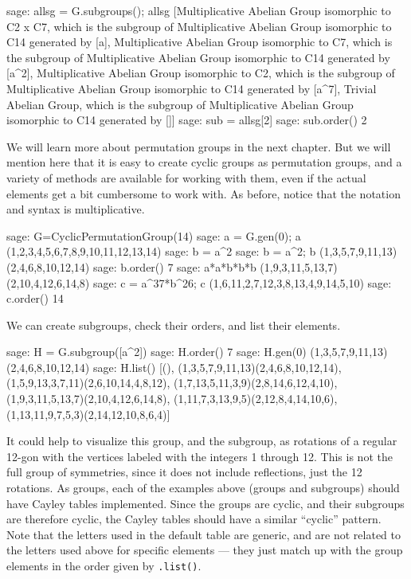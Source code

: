 %
\begin{sageexample}
sage: allsg = G.subgroups(); allsg
[Multiplicative Abelian Group isomorphic to C2 x C7,
 which is the subgroup of Multiplicative Abelian Group
 isomorphic to C14 generated by [a],
 Multiplicative Abelian Group isomorphic to C7,
 which is the subgroup of Multiplicative Abelian Group
 isomorphic to C14 generated by [a^2],
 Multiplicative Abelian Group isomorphic to C2,
 which is the subgroup of Multiplicative Abelian Group
 isomorphic to C14 generated by [a^7],
 Trivial Abelian Group,
 which is the subgroup of Multiplicative Abelian Group
 isomorphic to C14 generated by []]
sage: sub = allsg[2]
sage: sub.order()
2
\end{sageexample}
%
%
We will learn more about permutation groups in the next chapter.  But we will mention here that it is easy to create cyclic groups as permutation groups, and a variety of methods are available for working with them, even if the actual elements get a bit cumbersome to work with.  As before, notice that the notation and syntax is multiplicative.
%
\begin{sageexample}
sage: G=CyclicPermutationGroup(14)
sage: a = G.gen(0); a
(1,2,3,4,5,6,7,8,9,10,11,12,13,14)
sage: b = a^2
sage: b = a^2; b
(1,3,5,7,9,11,13)(2,4,6,8,10,12,14)
sage: b.order()
7
sage: a*a*b*b*b
(1,9,3,11,5,13,7)(2,10,4,12,6,14,8)
sage: c = a^37*b^26; c
(1,6,11,2,7,12,3,8,13,4,9,14,5,10)
sage: c.order()
14
\end{sageexample}
%
We can create subgroups, check their orders, and list their elements.
%
\begin{sageexample}
sage: H = G.subgroup([a^2])
sage: H.order()
7
sage: H.gen(0)
(1,3,5,7,9,11,13)(2,4,6,8,10,12,14)
sage: H.list()
[(),
 (1,3,5,7,9,11,13)(2,4,6,8,10,12,14),
 (1,5,9,13,3,7,11)(2,6,10,14,4,8,12),
 (1,7,13,5,11,3,9)(2,8,14,6,12,4,10),
 (1,9,3,11,5,13,7)(2,10,4,12,6,14,8),
 (1,11,7,3,13,9,5)(2,12,8,4,14,10,6),
 (1,13,11,9,7,5,3)(2,14,12,10,8,6,4)]
\end{sageexample}
%
It could help to visualize this group, and the subgroup, as rotations of a regular 12-gon with the vertices labeled with the integers 1 through 12.  This is not the full group of symmetries, since it does not include reflections, just the 12 rotations.
%
%
As groups, each of the examples above (groups and subgroups) should have Cayley tables implemented.  Since the groups are cyclic, and their subgroups are therefore cyclic, the Cayley tables should have a similar ``cyclic'' pattern.  Note that the letters used in the default table are generic, and are not related to the letters used above for specific elements --- they just match up with the group elements in the order given by \verb?.list()?.
